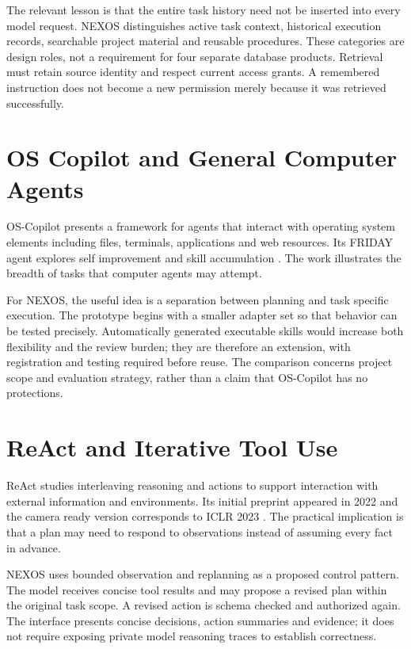 The relevant lesson is that the entire task history need not be inserted into every model request. NEXOS distinguishes active task context, historical execution records, searchable project material and reusable procedures. These categories are design roles, not a requirement for four separate database products. Retrieval must retain source identity and respect current access grants. A remembered instruction does not become a new permission merely because it was retrieved successfully.

\section{OS Copilot and General Computer Agents}
OS-Copilot presents a framework for agents that interact with operating system elements including files, terminals, applications and web resources. Its FRIDAY agent explores self improvement and skill accumulation \cite{oscopilot}. The work illustrates the breadth of tasks that computer agents may attempt.

For NEXOS, the useful idea is a separation between planning and task specific execution. The prototype begins with a smaller adapter set so that behavior can be tested precisely. Automatically generated executable skills would increase both flexibility and the review burden; they are therefore an extension, with registration and testing required before reuse. The comparison concerns project scope and evaluation strategy, rather than a claim that OS-Copilot has no protections.

\section{ReAct and Iterative Tool Use}
ReAct studies interleaving reasoning and actions to support interaction with external information and environments. Its initial preprint appeared in 2022 and the camera ready version corresponds to ICLR 2023 \cite{react}. The practical implication is that a plan may need to respond to observations instead of assuming every fact in advance.

NEXOS uses bounded observation and replanning as a proposed control pattern. The model receives concise tool results and may propose a revised plan within the original task scope. A revised action is schema checked and authorized again. The interface presents concise decisions, action summaries and evidence; it does not require exposing private model reasoning traces to establish correctness.

